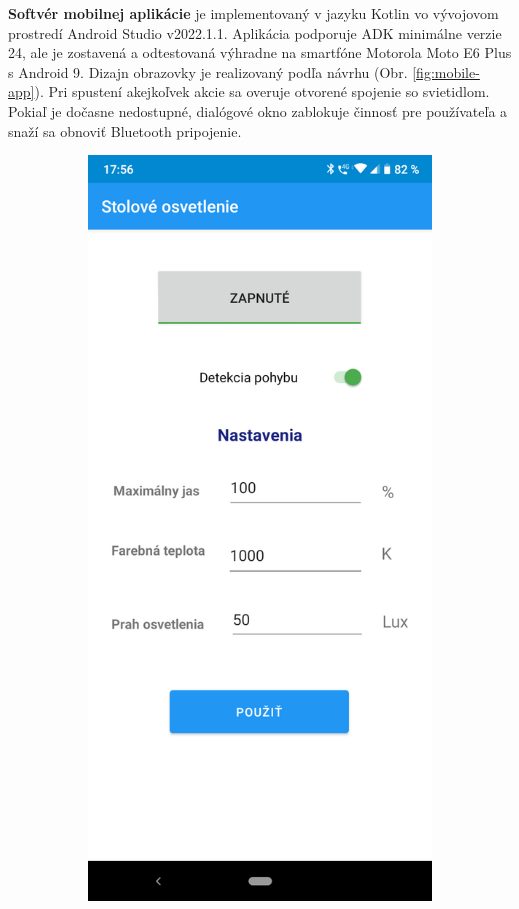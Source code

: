 \documentclass[12pt, a4paper]{article}
\begin{document}
\textbf{Softvér mobilnej aplikácie} je implementovaný v jazyku Kotlin vo vývojovom prostredí Android Studio v2022.1.1. Aplikácia podporuje ADK minimálne verzie 24, ale je zostavená a odtestovaná výhradne na smartfóne Motorola Moto E6 Plus s Android 9. Dizajn obrazovky je realizovaný podľa návrhu (Obr. \ref{fig:mobile-app}). Pri spustení akejkoľvek akcie sa overuje otvorené spojenie so svietidlom. Pokiaľ je dočasne nedostupné, dialógové okno zablokuje činnosť pre používateľa a snaží sa obnoviť Bluetooth pripojenie.

\begin{figure}[h]
\centering
\begin{subfigure}[b]{0.45\textwidth}
	\centering
	\includegraphics[width=\textwidth]{assets/mobile-app.png}

\end{subfigure}
\end{figure}
\end{document}

